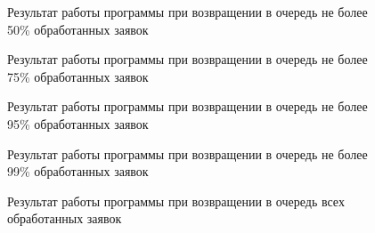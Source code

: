 \documentclass[14pt, a4paper]{extarticle}
\begin{document}
\begin{figure}[H]
\caption{Результат работы программы при возвращении в очередь не более 50\% обработанных заявок}
\label{fig:8_50}
\end{figure}

\begin{figure}[H]
\caption{Результат работы программы при возвращении в очередь не более 75\% обработанных заявок}
\label{fig:8_75}
\end{figure}

\begin{figure}[H]
\caption{Результат работы программы при возвращении в очередь не более 95\% обработанных заявок}
\label{fig:8_95}
\end{figure}

\begin{figure}[H]
\caption{Результат работы программы при возвращении в очередь не более 99\% обработанных заявок}
\label{fig:8_99}
\end{figure}

\begin{figure}[H]
\caption{Результат работы программы при возвращении в очередь всех обработанных заявок}
\label{fig:8_100}
\end{figure}
\end{document}
